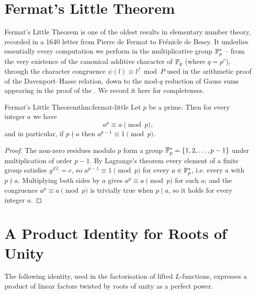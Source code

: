 \section{Fermat's Little Theorem}
Fermat's Little Theorem is one of the oldest results in elementary number theory, recorded in a 1640 letter from Pierre de Fermat to Fr\'{e}nicle de Bessy. It underlies essentially every computation we perform in the multiplicative group $\mathbb{F}_p^*$ -- from the very existence of the canonical additive character of $\mathbb{F}_q$ (where $q=p^r$), through the character congruence $\psi(l)\equiv l^f\bmod P$ used in the arithmetic proof of the Davenport--Hasse relation, down to the mod-$q$ reduction of Gauss sums appearing in the proof of the \QRthm. We record it here for completeness.
\begin{Theorem}{Fermat's Little Theorem}{thm:fermat-little}%
  Let $p$ be a prime. Then for every integer $a$ we have $$a^p\equiv a\pmod p,$$ and in particular, if $p\nmid a$ then $a^{p-1}\equiv 1\pmod p$.
\end{Theorem}
\begin{proof}
  The non-zero residues modulo $p$ form a group $\mathbb{F}_p^*=\{1,2,\dots,p-1\}$ under multiplication of order $p-1$. By Lagrange's theorem every element of a finite group satisfies $g^{|G|}=e$, so $a^{p-1}\equiv 1\pmod p$ for every $a\in\mathbb{F}_p^*$, i.e. every $a$ with $p\nmid a$. Multiplying both sides by $a$ gives $a^p\equiv a\pmod p$ for such $a$; and the congruence $a^p\equiv a\pmod p$ is trivially true when $p\mid a$, so it holds for every integer $a$.
\end{proof}

\section{A Product Identity for Roots of Unity}

The following identity, used in the factorisation of lifted $L$-functions, expresses a product of linear factors twisted by roots of unity as a perfect power.

